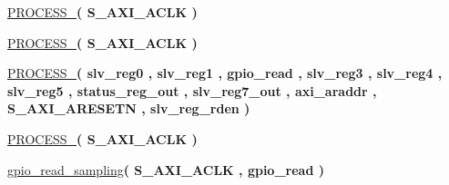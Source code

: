 \begin{DoxyCompactItemize}
\item 
\mbox{\label{classGPIO__v1__0__S00__AXI_1_1arch__imp_aeef87657fc8d27430790f1e6088ab81f}} 
\hyperlink{classGPIO__v1__0__S00__AXI_1_1arch__imp_aeef87657fc8d27430790f1e6088ab81f}{P\+R\+O\+C\+E\+S\+S\+\_}{\bfseries  ( {\bfseries \textcolor{vhdlchar}{S\+\_\+\+A\+X\+I\+\_\+\+A\+C\+LK}\textcolor{vhdlchar}{ }} )}
\item 
\mbox{\label{classGPIO__v1__0__S00__AXI_1_1arch__imp_a7390c9b34974c278e7646b784061d076}} 
\hyperlink{classGPIO__v1__0__S00__AXI_1_1arch__imp_a7390c9b34974c278e7646b784061d076}{P\+R\+O\+C\+E\+S\+S\+\_}{\bfseries  ( {\bfseries \textcolor{vhdlchar}{S\+\_\+\+A\+X\+I\+\_\+\+A\+C\+LK}\textcolor{vhdlchar}{ }} )}
\item 
\mbox{\label{classGPIO__v1__0__S00__AXI_1_1arch__imp_a7eca128197092fa81fcaaba67313360f}} 
\hyperlink{classGPIO__v1__0__S00__AXI_1_1arch__imp_a7eca128197092fa81fcaaba67313360f}{P\+R\+O\+C\+E\+S\+S\+\_}{\bfseries  ( {\bfseries \textcolor{vhdlchar}{slv\+\_\+reg0}\textcolor{vhdlchar}{ }} , {\bfseries \textcolor{vhdlchar}{slv\+\_\+reg1}\textcolor{vhdlchar}{ }} , {\bfseries \textcolor{vhdlchar}{gpio\+\_\+read}\textcolor{vhdlchar}{ }} , {\bfseries \textcolor{vhdlchar}{slv\+\_\+reg3}\textcolor{vhdlchar}{ }} , {\bfseries \textcolor{vhdlchar}{slv\+\_\+reg4}\textcolor{vhdlchar}{ }} , {\bfseries \textcolor{vhdlchar}{slv\+\_\+reg5}\textcolor{vhdlchar}{ }} , {\bfseries \textcolor{vhdlchar}{status\+\_\+reg\+\_\+out}\textcolor{vhdlchar}{ }} , {\bfseries \textcolor{vhdlchar}{slv\+\_\+reg7\+\_\+out}\textcolor{vhdlchar}{ }} , {\bfseries \textcolor{vhdlchar}{axi\+\_\+araddr}\textcolor{vhdlchar}{ }} , {\bfseries \textcolor{vhdlchar}{S\+\_\+\+A\+X\+I\+\_\+\+A\+R\+E\+S\+E\+TN}\textcolor{vhdlchar}{ }} , {\bfseries \textcolor{vhdlchar}{slv\+\_\+reg\+\_\+rden}\textcolor{vhdlchar}{ }} )}
\item 
\mbox{\label{classGPIO__v1__0__S00__AXI_1_1arch__imp_a45eef1701e94703c5a3cf169c02e5e2c}} 
\hyperlink{classGPIO__v1__0__S00__AXI_1_1arch__imp_a45eef1701e94703c5a3cf169c02e5e2c}{P\+R\+O\+C\+E\+S\+S\+\_}{\bfseries  ( {\bfseries \textcolor{vhdlchar}{S\+\_\+\+A\+X\+I\+\_\+\+A\+C\+LK}\textcolor{vhdlchar}{ }} )}
\item 
\hyperlink{classGPIO__v1__0__S00__AXI_1_1arch__imp_a29a70265aec87dff63669cc686cdd7b6}{gpio\+\_\+read\+\_\+sampling}{\bfseries  ( {\bfseries \textcolor{vhdlchar}{S\+\_\+\+A\+X\+I\+\_\+\+A\+C\+LK}\textcolor{vhdlchar}{ }} , {\bfseries \textcolor{vhdlchar}{gpio\+\_\+read}\textcolor{vhdlchar}{ }} )}

\end{DoxyCompactItemize}
